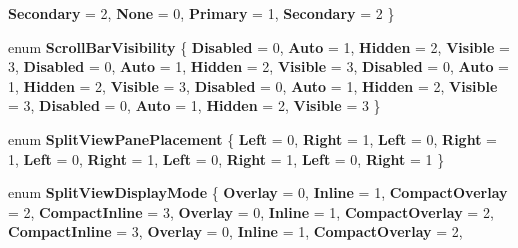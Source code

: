 \begin{DoxyCompactItemize}
{\bfseries Secondary} = 2, 
\newline
{\bfseries None} = 0, 
{\bfseries Primary} = 1, 
{\bfseries Secondary} = 2
 \}
\item 
\mbox{\label{namespace_windows_1_1_u_i_1_1_xaml_1_1_controls_a001a76f53e0cb6e7acfde3aeca1adf39}} 
enum {\bfseries Scroll\+Bar\+Visibility} \{ \newline
{\bfseries Disabled} = 0, 
{\bfseries Auto} = 1, 
{\bfseries Hidden} = 2, 
{\bfseries Visible} = 3, 
\newline
{\bfseries Disabled} = 0, 
{\bfseries Auto} = 1, 
{\bfseries Hidden} = 2, 
{\bfseries Visible} = 3, 
\newline
{\bfseries Disabled} = 0, 
{\bfseries Auto} = 1, 
{\bfseries Hidden} = 2, 
{\bfseries Visible} = 3, 
\newline
{\bfseries Disabled} = 0, 
{\bfseries Auto} = 1, 
{\bfseries Hidden} = 2, 
{\bfseries Visible} = 3, 
\newline
{\bfseries Disabled} = 0, 
{\bfseries Auto} = 1, 
{\bfseries Hidden} = 2, 
{\bfseries Visible} = 3
 \}
\item 
\mbox{\label{namespace_windows_1_1_u_i_1_1_xaml_1_1_controls_a9bf3cca91778a25f599f39263931d8f8}} 
enum {\bfseries Split\+View\+Pane\+Placement} \{ \newline
{\bfseries Left} = 0, 
{\bfseries Right} = 1, 
{\bfseries Left} = 0, 
{\bfseries Right} = 1, 
\newline
{\bfseries Left} = 0, 
{\bfseries Right} = 1, 
{\bfseries Left} = 0, 
{\bfseries Right} = 1, 
\newline
{\bfseries Left} = 0, 
{\bfseries Right} = 1
 \}
\item 
\mbox{\label{namespace_windows_1_1_u_i_1_1_xaml_1_1_controls_a027ad5600573e78453a72cce427da307}} 
enum {\bfseries Split\+View\+Display\+Mode} \{ \newline
{\bfseries Overlay} = 0, 
{\bfseries Inline} = 1, 
{\bfseries Compact\+Overlay} = 2, 
{\bfseries Compact\+Inline} = 3, 
\newline
{\bfseries Overlay} = 0, 
{\bfseries Inline} = 1, 
{\bfseries Compact\+Overlay} = 2, 
{\bfseries Compact\+Inline} = 3, 
\newline
{\bfseries Overlay} = 0, 
{\bfseries Inline} = 1, 
{\bfseries Compact\+Overlay} = 2, 

\end{DoxyCompactItemize}
